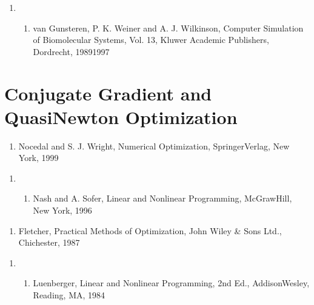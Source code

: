 \documentclass[letterpaper,11pt,english]{sphinxmanual}
\begin{document}
\begin{enumerate}
%
\setcounter{enumi}{22}
\item {} \begin{enumerate}
%
\setcounter{enumii}{5}
\item {} 
van Gunsteren, P. K. Weiner and A. J. Wilkinson, Computer Simulation of Biomolecular Systems, Vol. 1\sphinxhyphen{}3, Kluwer Academic Publishers, Dordrecht, 1989\sphinxhyphen{}1997

\end{enumerate}

\end{enumerate}


\section{Conjugate Gradient and Quasi\sphinxhyphen{}Newton Optimization}
\label{\detokenize{text/references:conjugate-gradient-and-quasi-newton-optimization}}\begin{enumerate}
%
\setcounter{enumi}{9}
\item {} 
Nocedal and S. J. Wright, Numerical Optimization, Springer\sphinxhyphen{}Verlag, New York, 1999

\end{enumerate}
\begin{enumerate}
%
\setcounter{enumi}{18}
\item {} \begin{enumerate}
%
\setcounter{enumii}{6}
\item {} 
Nash and A. Sofer, Linear and Nonlinear Programming, McGraw\sphinxhyphen{}Hill, New York, 1996

\end{enumerate}

\end{enumerate}
\begin{enumerate}
%
\setcounter{enumi}{17}
\item {} 
Fletcher, Practical Methods of Optimization, John Wiley \& Sons Ltd., Chichester, 1987

\end{enumerate}
\begin{enumerate}
%
\setcounter{enumi}{3}
\item {} \begin{enumerate}
%
\setcounter{enumii}{6}
\item {} 
Luenberger, Linear and Nonlinear Programming, 2nd Ed., Addison\sphinxhyphen{}Wesley, Reading, MA, 1984

\end{enumerate}

\end{enumerate}
\end{document}
